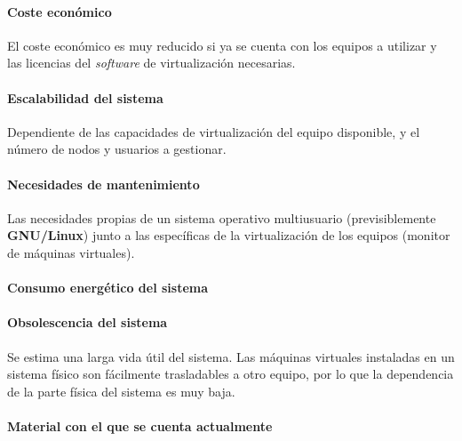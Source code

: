 \paragraph{Coste económico\\}

El coste económico es muy reducido si ya se cuenta con los equipos a utilizar y las licencias del \textit{software} de virtualización necesarias.

\paragraph{Escalabilidad del sistema\\}

Dependiente de las capacidades de virtualización del equipo disponible, y el número de nodos y usuarios a gestionar.

\paragraph{Necesidades de mantenimiento\\}

Las necesidades propias de un sistema operativo multiusuario (previsiblemente \textbf{GNU/Linux}) junto a las específicas de la virtualización de los equipos (monitor de máquinas virtuales).

\paragraph{Consumo energético del sistema\\}


\paragraph{Obsolescencia del sistema\\}

Se estima una larga vida útil del sistema. Las máquinas virtuales instaladas en un sistema físico son fácilmente trasladables a otro equipo, por lo que la dependencia de la parte física del sistema es muy baja.

\paragraph{Material con el que se cuenta actualmente\\}

